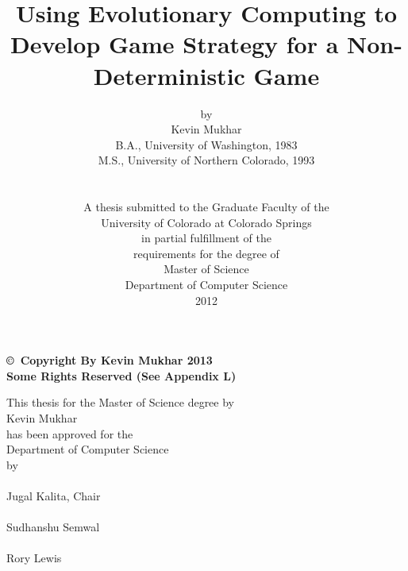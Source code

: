 
\title{\bf {\LARGE Using Evolutionary Computing to Develop Game Strategy for a Non-Deterministic Game}}
\author{by \\ Kevin Mukhar \\  B.A., University of Washington, 1983 \\ 
M.S., University of Northern Colorado, 1993 
\\
\\
\\ A thesis submitted to the Graduate Faculty of the \\
University of Colorado at Colorado Springs \\
in partial fulfillment of the \\
requirements for the degree of \\
Master of Science \\
Department of Computer Science \\
2012 }
\date{}

\maketitle

\setcounter{page}{2}

\newpage

\pagestyle{plain}

\begin{minipage}[t]{5.0in}
	\vspace{7.0in}
	\bf \copyright \ Copyright By Kevin Mukhar 2013 \\[-1.0pc]
	Some Rights Reserved (See Appendix L) \rm
\end{minipage}



\newpage

\begin{center}
	This thesis for the Master of Science degree by \\
	Kevin Mukhar \\
	has been approved for the \\
 	Department of Computer Science \\
	by \\ 
	\vspace{3.0pc}
	\makebox[3in]{\hrulefill} \\[-1.0pc]
	Jugal Kalita, Chair \\
	\vspace{3.0pc}
	\makebox[3in]{\hrulefill} \\[-1.0pc] 
	Sudhanshu Semwal \\
	\vspace{3.0pc}
	\makebox[3in]{\hrulefill} \\[-1.0pc] 
	Rory Lewis \\
\end{center}


